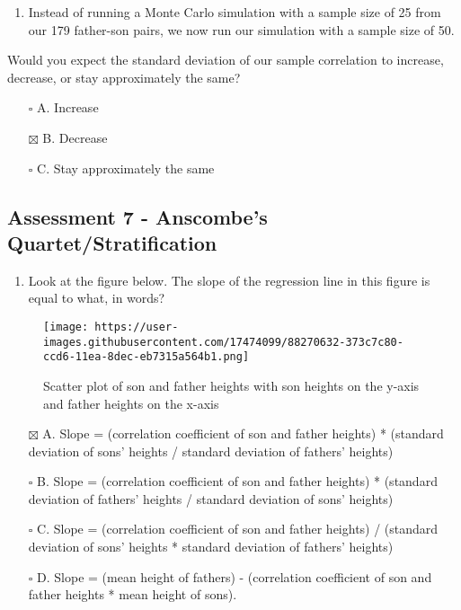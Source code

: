 \documentclass[
]{article}
\providecommand{\tightlist}{%
  \setlength{\itemsep}{0pt}\setlength{\parskip}{0pt}}
\begin{document}
\begin{enumerate}
\def\labelenumi{\arabic{enumi}.}
\setcounter{enumi}{1}
\tightlist
\item
  Instead of running a Monte Carlo simulation with a sample size of 25
  from our 179 father-son pairs, we now run our simulation with a sample
  size of 50.
\end{enumerate}

Would you expect the standard deviation of our sample correlation to
increase, decrease, or stay approximately the same?

\begin{itemize}
\tightlist
\item[$\square$]
  A. Increase
\item[$\boxtimes$]
  B. Decrease
\item[$\square$]
  C. Stay approximately the same
\end{itemize}

\hypertarget{assessment-7---anscombes-quartetstratification}{%
\subsection{Assessment 7 - Anscombe's
Quartet/Stratification}\label{assessment-7---anscombes-quartetstratification}}

\begin{enumerate}
\def\labelenumi{\arabic{enumi}.}
\tightlist
\item
  Look at the figure below. The slope of the regression line in this
  figure is equal to what, in words?
\end{enumerate}

\begin{figure}
\centering
\texttt{[image: https://user-images.githubusercontent.com/17474099/88270632-373c7c80-ccd6-11ea-8dec-eb7315a564b1.png]}
\caption{Scatter plot of son and father heights with son heights on the
y-axis and father heights on the x-axis}
\end{figure}

\begin{itemize}
\tightlist
\item[$\boxtimes$]
  A. Slope = (correlation coefficient of son and father heights) *
  (standard deviation of sons' heights / standard deviation of fathers'
  heights)
\item[$\square$]
  B. Slope = (correlation coefficient of son and father heights) *
  (standard deviation of fathers' heights / standard deviation of sons'
  heights)
\item[$\square$]
  C. Slope = (correlation coefficient of son and father heights) /
  (standard deviation of sons' heights * standard deviation of fathers'
  heights)
\item[$\square$]
  D. Slope = (mean height of fathers) - (correlation coefficient of son
  and father heights * mean height of sons).
\end{itemize}
\end{document}
